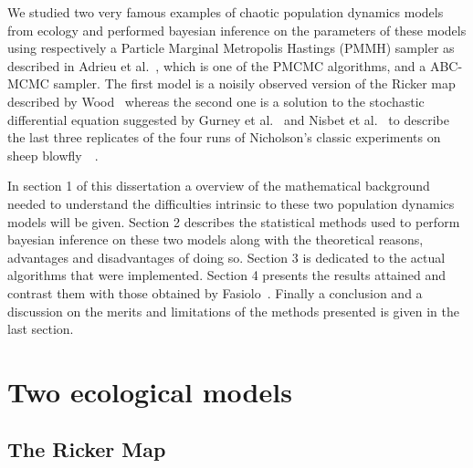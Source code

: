 \documentclass[12pt]{article}
\begin{document}
	We studied two very famous examples of chaotic population dynamics models from ecology and performed bayesian inference on the parameters of these models using respectively a Particle Marginal Metropolis Hastings (PMMH) sampler as described in Adrieu et al.~\cite{andrieu2010particle}, which is one of the PMCMC algorithms, and a ABC-MCMC sampler. The first model is a noisily observed version of the Ricker map described by Wood~\cite{wood2010statistical} whereas the second one is a solution to the stochastic differential equation suggested by Gurney et al.~\cite{gurney1980nicholson} and Nisbet et al.~\cite{nisbet1982modelling} to describe the last three replicates of the four runs of Nicholson’s classic experiments on sheep blowfly~\cite{nicholson1954outline}~\cite{nicholson1957self}.
	
	In section 1 of this dissertation a overview of the mathematical background needed to understand the difficulties intrinsic to these two population dynamics models will be given. Section 2 describes the statistical methods used to perform bayesian inference on these two models along with the theoretical reasons, advantages and disadvantages of doing so. Section 3 is dedicated to the actual algorithms that were implemented. Section 4 presents the results attained and contrast them with those obtained by Fasiolo~\cite{fasiolo2014statistical}. Finally a conclusion and a discussion on the merits and limitations of the methods presented is given in the last section.
	
	\section{Two ecological models}
	\subsection{The Ricker Map}  \label{rickerGen}
\end{document}
